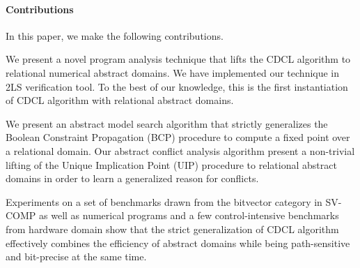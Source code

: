\paragraph{Contributions}
In this paper, we make the following contributions.
\begin{compactenum}
\item We present a novel program analysis technique that 
lifts the CDCL algorithm to relational numerical abstract domains.   
We have implemented our technique in 2LS verification tool.  To 
the best of our knowledge, this is the first instantiation of CDCL 
algorithm with relational abstract domains. 

\item We present an abstract model search algorithm that strictly 
generalizes the Boolean Constraint Propagation (BCP) procedure to
compute a fixed point over a relational domain.  Our abstract 
conflict analysis algorithm present a non-trivial lifting of the 
Unique Implication Point (UIP) procedure to relational abstract 
domains in order to learn a generalized reason for conflicts.  
 
\item  Experiments on a set of benchmarks drawn from the bitvector 
category in SV-COMP as well as numerical programs and a few 
control-intensive benchmarks from hardware domain show that 
the strict generalization of CDCL algorithm effectively combines 
the efficiency of abstract domains while being path-sensitive and 
bit-precise at the same time.  
\end{compactenum}
